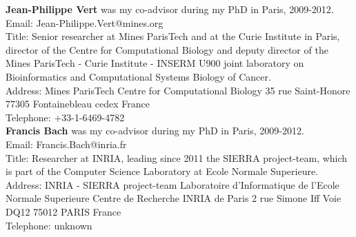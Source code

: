 \documentclass{article}
\begin{document}
{\bf Jean-Philippe Vert} was my co-advisor during my PhD in Paris, 2009-2012.\\
Email: Jean-Philippe.Vert@mines.org\\
Title: Senior researcher at Mines ParisTech and at the Curie Institute in Paris, director of the Centre for Computational Biology and deputy director of the Mines ParisTech - Curie Institute - INSERM U900 joint laboratory on Bioinformatics and Computational Systems Biology of Cancer.\\
Address: Mines ParisTech
Centre for Computational Biology
35 rue Saint-Honore
77305 Fontainebleau cedex
France\\
Telephone: +33-1-6469-4782\\

{\bf Francis Bach} was my co-advisor during my PhD in Paris, 2009-2012.\\
Email: Francis.Bach@inria.fr\\
Title: Researcher at INRIA, leading since 2011 the SIERRA project-team, which is part of the Computer Science Laboratory at Ecole Normale Superieure.\\
Address: INRIA - SIERRA project-team
Laboratoire d'Informatique de l'Ecole Normale Superieure 
Centre de Recherche INRIA de Paris
2 rue Simone Iff
Voie DQ12
75012 PARIS
France\\
Telephone: unknown
\end{document}
